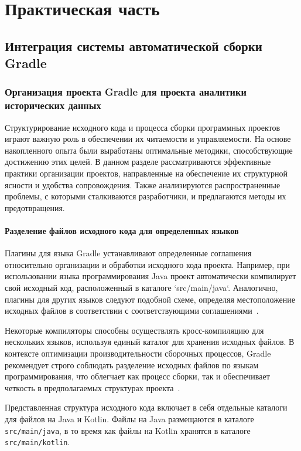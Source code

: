 \chapter{Практическая часть}


\section{Интеграция системы автоматической сборки Gradle}

\subsection{Организация проекта Gradle для проекта аналитики исторических данных}

Структурирование исходного кода и процесса сборки программных проектов играют важную роль в
обеспечении их читаемости и управляемости.
На основе накопленного опыта были выработаны оптимальные
методики, способствующие достижению этих целей.
В данном разделе рассматриваются эффективные
практики организации проектов, направленные на обеспечение их структурной ясности и удобства
сопровождения.
Также анализируются распространенные проблемы, с которыми сталкиваются разработчики,
и предлагаются методы их предотвращения.

\subsubsection{Разделение файлов исходного кода для определенных языков}

Плагины для языка Gradle устанавливают определенные соглашения относительно организации и обработки
исходного кода проекта.
Например, при использовании языка программирования Java проект автоматически
компилирует
свой исходный код, расположенный в каталоге `src/main/java`.
Аналогично, плагины для других языков
следуют подобной схеме, определяя местоположение исходных файлов в соответствии с соответствующими
соглашениями~\cite{plugin_java}.

Некоторые компиляторы способны осуществлять кросс-компиляцию для нескольких языков, используя единый
каталог для хранения исходных файлов.
В контексте оптимизации производительности сборочных
процессов, Gradle рекомендует строго соблюдать
разделение исходных файлов по языкам программирования, что облегчает как процесс сборки, так и
обеспечивает четкость в предполагаемых структурах
проекта~\cite{organize_gradle_project}.

Представленная структура исходного кода включает в себя отдельные каталоги для файлов на Java и
Kotlin.
Файлы на Java размещаются в каталоге \texttt{src/main/java}, в то время как файлы на Kotlin
хранятся
в каталоге \texttt{src/main/kotlin}.


